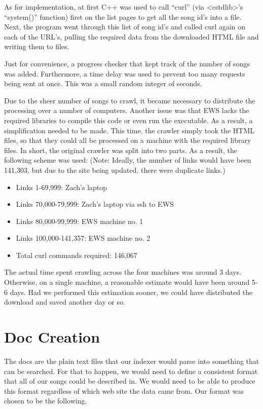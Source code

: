 \documentclass{acm} %
\begin{document}
\begin{CJK}{UTF8}{zhsong}
As for implementation, at first C++ was used to call ``curl'' (via <cstdlib>'s ``system()'' function) first on the list pages to get all the song id's into a file. Next, the program went through this list of song id's and called curl again on each of the URL's, pulling the required data from the downloaded HTML file and writing them to files.

Just for convenience, a progress checker that kept track of the number of songs was added. Furthermore, a time delay was used to prevent too many requests being sent at once. This was a small random integer of seconds.

Due to the sheer number of songs to crawl, it became necessary to distribute the processing over a number of computers. Another issue was that EWS lacks the required libraries to compile this code or even run the executable. As a result, a simplification needed to be made. This time, the crawler simply took the HTML files, so that they could all be processed on a machine with the required library files. In short, the original crawler was split into two parts. As a result, the following scheme was used: (Note: Ideally, the number of links would have been 141,303, but due to the site being updated, there were duplicate links.)

\begin{itemize}
 \item Links 1-69,999: Zach's laptop
 \item Links 70,000-79,999: Zach's laptop via ssh to EWS
 \item Links 80,000-99,999: EWS machine no. 1
 \item Links 100,000-141,357: EWS machine no. 2
 \item Total curl commands required: 146,067
\end{itemize}

The actual time spent crawling across the four machines was around 3 days. Otherwise, on a single machine, a reasonable estimate would have been around 5-6 days. Had we performed this estimation sooner, we could have distributed the download and saved another day or so.

\section{Doc Creation}

The docs are the plain text files that our indexer would parse into something that can be searched. For that to happen, we would need to define a consistent format that all of our songs could be described in. We would need to be able to produce this format regardless of which web site the data came from. Our format was chosen to be the following.


\end{CJK}
\end{document}
